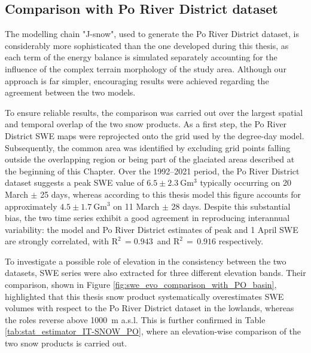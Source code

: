 \subsection{Comparison with Po River District dataset}

The modelling chain "J-snow", used to generate the Po River District dataset, is considerably more sophisticated than the one developed during this thesis, 
as each term of the energy balance is simulated separately accounting for the influence of the complex terrain morphology of the study area. Although 
our approach is far simpler, encouraging results were achieved regarding the agreement between the two models.


To ensure reliable results, the comparison was carried out over the largest spatial and temporal overlap of the two snow products. As a first step, the Po 
River District SWE maps were reprojected onto the grid used by the degree-day model. Subsequently, the common area was identified by excluding grid points 
falling outside the overlapping region or being part of the glaciated areas described at the beginning of this Chapter. Over the 1992--2021 period, the Po 
River District dataset suggests a peak SWE value of $6.5 \pm \SI{2.3}{\giga\meter\cubed}$ typically occurring on 20 March $\pm$ 25 days, whereas according 
to this thesis model this figure accounts for approximately $4.5 \pm \SI{1.7}{\giga\meter\cubed}$ on 11 March $\pm$ 28 days. Despite this substantial bias, 
the two time series exhibit a good agreement in reproducing interannual variability: the model and Po River District estimates of peak and 1 April SWE are 
strongly correlated, with $\text{R}^2\,=0.943\,$ and  $\text{R}^2\,=\,0.916$ respectively.

To investigate a possible role of elevation in the consistency between the two datasets, SWE series were also extracted for three 
different elevation bands. Their comparison, shown in Figure \ref{fig:swe_evo_comparison_with_PO_basin}, highlighted that this 
thesis snow product systematically overestimates SWE volumes with respect to the Po River District dataset in the lowlands, whereas 
the roles reverse above \SI{1000}{\meter} a.s.l. This is further confirmed in Table \ref{tab:stat_estimator_IT-SNOW_PO}, where an elevation-wise comparison 
of the two snow products is carried out.

